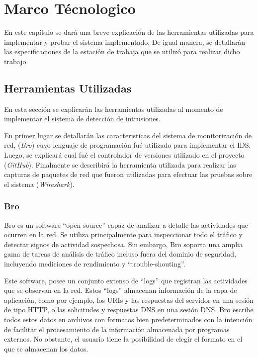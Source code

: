 \chapter{Marco Técnologico}
\label{capituloTecnologico}

En este capítulo se dará una breve explicación de las herramientas utilizadas para implementar y probar el sistema implementado. De igual manera, se detallarán las especificaciones de la estación de trabaja que se utilizó para realizar dicho trabajo.  

\section{Herramientas Utilizadas}

En esta sección se explicarán las herramientas utilizadas al momento de implementar el sistema  de detección de intrusiones.

En primer lugar se detallarán las caracteristicas del sistema de monitorización de red, (\textit{Bro}) cuyo lenguaje de programación fué utilizado para implementar el IDS. Luego, se explicará cual fué el controlador de versiones utilizado en el proyecto (\textit{GitHub}). Finalmente se describirá la herramienta utilizada para realizar las capturas de paquetes de red que fueron utilizadas para efectuar las pruebas sobre el sistema (\textit{Wireshark}).  

\subsection{Bro}\label{ssec:Bro}

Bro es un software ``open source'' capáz de analizar a detalle las actividades que ocurren en la red. Se utiliza principalmente para inspeccionar todo el tráfico y detectar signos de actividad sospechosa. Sin embargo, Bro soporta una amplia gama de tareas de análisis de tráfico incluso fuera del dominio de seguridad, incluyendo mediciones de rendimiento y ``trouble-shouting''.\cite{Bro}

Este software, posee un conjunto extenso de ``logs'' que registran las actividades que se observan en la red. Estos ``logs'' almacenan información de la capa de aplicación, como por ejemplo, los URIs y las respuestas del servidor en una sesión de tipo HTTP, o las solicitudes y respuestas DNS en una sesión DNS. Bro escribe todos estos datos en archivos con formatos bien predeterminados con la intención de facilitar el procesamiento de la información almacenada por programas externos. No obstante, el usuario tiene la posibilidad de elegir el formato en el que se almacenan los datos.

